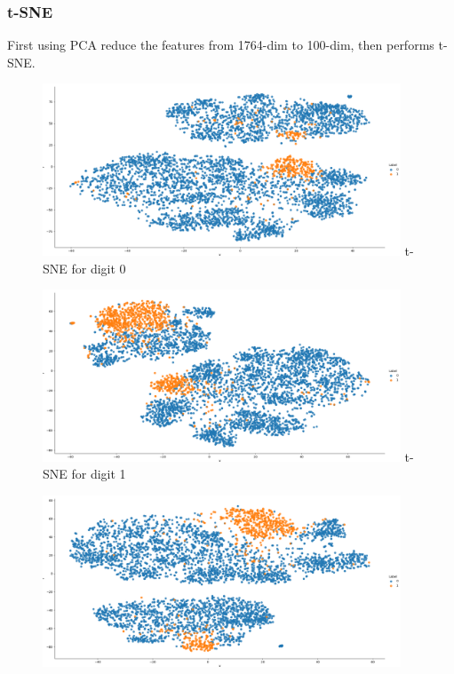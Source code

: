 \documentclass{article}
\begin{document}
\subsubsection{t-SNE}
First using PCA reduce the features from 1764-dim to 100-dim, then performs t-SNE.
\begin{figure}[H]
    \centering
    \begin{minipage}{0.32\textwidth}
        \centering
        \includegraphics[width=0.95\textwidth]{fig/pca/t0.png}
        t-SNE for digit 0
    \end{minipage}
    \begin{minipage}{0.32\textwidth}
        \centering
        \includegraphics[width=0.95\textwidth]{fig/pca/t1.png}
        t-SNE for digit 1
    \end{minipage}
    \begin{minipage}{0.32\textwidth}
        \centering
        \includegraphics[width=0.95\textwidth]{fig/pca/t2.png}

\end{minipage}
\end{figure}
\end{document}
